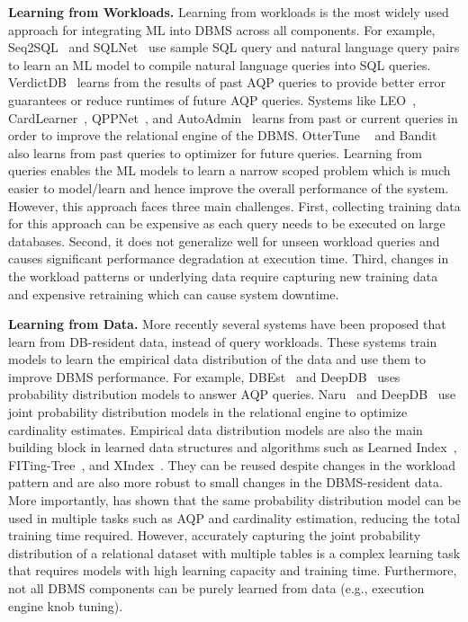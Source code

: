 \vspace{2mm}
\noindent \textbf{Learning from Workloads.} Learning from workloads is the most widely used approach for integrating ML into DBMS across all components.
For example, Seq2SQL~\cite{seq2sql} and SQLNet~\cite{sqlnet} use sample SQL query and natural language query pairs to learn an ML model to compile natural language queries into SQL queries.
VerdictDB~\cite{verdict} learns from the results of past AQP queries to provide better error guarantees or reduce runtimes of future AQP queries.
Systems like LEO~\cite{leo}, CardLearner~\cite{cardlearner}, QPPNet~\cite{qppnet}, and AutoAdmin~\cite{autoadmin} learns from past or current queries in order to improve the relational engine of the DBMS.
OtterTune ~\cite{ottertune} and Bandit~\cite{bandit} also learns from past queries to optimizer for future queries.
Learning from queries enables the ML models to learn a narrow scoped problem which is much easier to model/learn and hence improve the overall performance of the system.
However, this approach faces three main challenges.
First, collecting training data for this approach can be expensive as each query needs to be executed on large databases.
Second, it does not generalize well for unseen workload queries and causes significant performance degradation at execution time.
Third, changes in the workload patterns or underlying data require capturing new training data and expensive retraining which can cause system downtime.

\vspace{2mm}
\noindent \textbf{Learning from Data.} More recently several systems have been proposed that learn from DB-resident data, instead of query workloads.
These systems train models to learn the empirical data distribution of the data and use them to improve DBMS performance.
For example, DBEst~\cite{dbest} and DeepDB~\cite{deepdb} uses probability distribution models to answer AQP queries.
Naru~\cite{naru} and DeepDB~\cite{deepdb} use joint probability distribution models in the relational engine to optimize cardinality estimates.
Empirical data distribution models are also the main building block in learned data structures and algorithms such as Learned Index~\cite{learnedindex}, FITing-Tree~\cite{fitingtree}, and XIndex~\cite{xindex}.
They can be reused despite changes in the workload pattern and are also more robust to small changes in the DBMS-resident data.
More importantly, \cite{deepdb} has shown that the same probability distribution model can be used in multiple tasks such as AQP and cardinality estimation, reducing the total training time required.
However, accurately capturing the joint probability distribution of a relational dataset with multiple tables is a complex learning task that requires models with high learning capacity and training time.
Furthermore, not all DBMS components can be purely learned from data (e.g., execution engine knob tuning).

